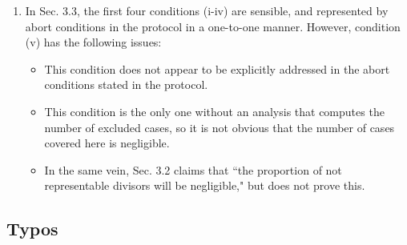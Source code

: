 \documentclass{article}
\theoremstyle{definition}
\newcommand{\6}{\mathbf}
\newcommand{\7}{\mathcal}
\newcommand{\free}[1]{{\textcolor{red}{#1}}}
\newcommand{\brando}[1]{{\textcolor{green}{#1}}}
\begin{document}
\begin{enumerate}
    \item In Sec. 3.3, the first four conditions (i-iv) are sensible, and represented by abort conditions in the protocol in a one-to-one manner. However, condition (v) has the following issues:
    \begin{itemize}
    \item This condition does not appear to be explicitly addressed in the abort conditions stated in the protocol.
    \item This condition is the only one without an analysis that computes the number of excluded cases, so it is not obvious that the number of cases covered here is negligible. 
    \item In the same vein, Sec. 3.2 claims that ``the proportion of not representable divisors will be negligible," but does not prove this.
    \end{itemize}

\end{enumerate}







\subsection{Typos}\label{sec:typo}
\end{document}
